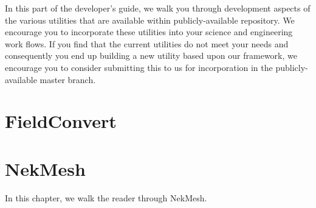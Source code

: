 
In this part of the developer's guide, we walk you through development aspects of the various utilities that are available within publicly-available \nek repository.
We encourage you to incorporate these utilities into your science and engineering work flows.  If you find that the current utilities do not meet your needs and consequently you end up building
a new utility based upon our framework, we encourage you to consider submitting this to us for incorporation in the publicly-available master branch.


\chapter{FieldConvert}




\chapter{NekMesh}

In this chapter, we walk the reader through NekMesh.


